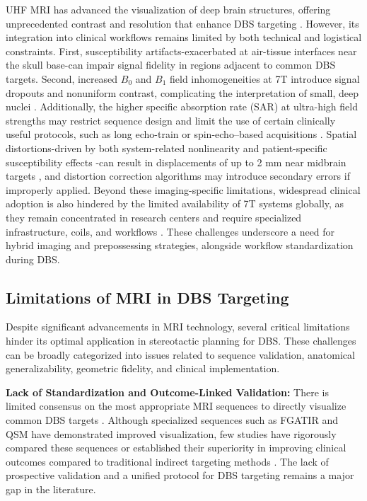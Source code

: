 UHF MRI has advanced the visualization of deep brain structures, offering unprecedented contrast and resolution that enhance DBS targeting \cite{Isaacs2020-gq}. However, its integration into clinical workflows remains limited by both technical and logistical constraints. First, susceptibility artifacts-exacerbated at air-tissue interfaces near the skull base-can impair signal fidelity in regions adjacent to common DBS targets. Second, increased \(B_0\) and \(B_1\) field inhomogeneities at 7T introduce signal dropouts and nonuniform contrast, complicating the interpretation of small, deep nuclei \cite{Okada2022-fg}. Additionally, the higher specific absorption rate (SAR) at ultra-high field strengths may restrict sequence design and limit the use of certain clinically useful protocols, such as long echo-train or spin-echo–based acquisitions \cite{Okada2022-ln}. Spatial distortions-driven by both system-related nonlinearity and patient-specific susceptibility effects \cite{Lau2018-fp}-can result in displacements of up to 2 mm near midbrain targets \cite{Kirby2023-la}, and distortion correction algorithms may introduce secondary errors if improperly applied. Beyond these imaging-specific limitations, widespread clinical adoption is also hindered by the limited availability of 7T systems globally, as they remain concentrated in research centers and require specialized infrastructure, coils, and workflows \cite{Forstmann2017-gz,Boutet2021-vg}. These challenges underscore a need for hybrid imaging and prepossessing strategies, alongside workflow standardization during DBS.

\subsection{Limitations of MRI in DBS Targeting}
\label{sec:MRI_limitations}

Despite significant advancements in MRI technology, several critical limitations hinder its optimal application in stereotactic planning for DBS. These challenges can be broadly categorized into issues related to sequence validation, anatomical generalizability, geometric fidelity, and clinical implementation.

\textbf{Lack of Standardization and Outcome-Linked Validation:} There is limited consensus on the most appropriate MRI sequences to directly visualize common DBS targets \cite{Vitek2010-cn,Middlebrooks2020-vv}. Although specialized sequences such as FGATIR and QSM have demonstrated improved visualization, few studies have rigorously compared these sequences or established their superiority in improving clinical outcomes compared to traditional indirect targeting methods \cite{Boutet2021-vg}. The lack of prospective validation and a unified protocol for DBS targeting remains a major gap in the literature.

